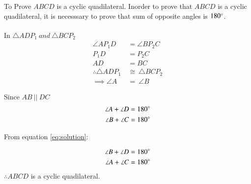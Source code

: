 To Prove $ABCD$ is a cyclic quadilateral.
\solution Inorder to prove that $ABCD$ is a cyclic quadilateral, it is necesssary to prove that sum of opposite angles is $180\degree$. \\ \\
In $\triangle ADP_1\ and\  \triangle BCP_2$
\begin{align}
\angle AP_1D &= \angle BP_2C \nonumber \\
P_1D &= P_2C \nonumber \\
AD &= BC \nonumber \\
\therefore \triangle ADP_1\  &\cong\  \triangle BCP_2  \nonumber \\
\implies \angle A \ &=\ \angle B \label{eq:solution}
\end{align}

Since $AB\ || \ DC$ 
\begin{align}
\angle A + \angle D &= 180\degree \\
\angle B + \angle C &= 180\degree 
\end{align}

From equation \ref{eq:solution}:

\begin{align}
\angle B + \angle D &= 180\degree \\
\angle A + \angle C &= 180\degree 
\end{align}
$\therefore ABCD$ is a cyclic quadilateral.
